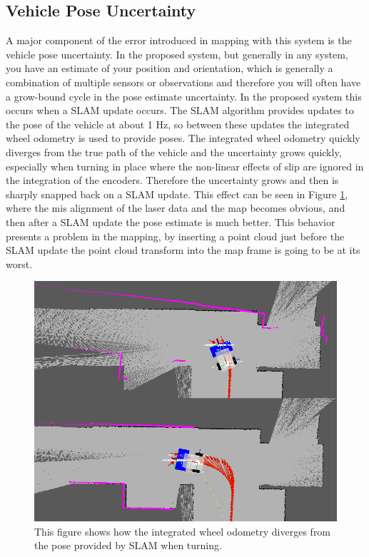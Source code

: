 \documentclass[12pt]{report}
\begin{document}
\subsection{Vehicle Pose Uncertainty}
A major component of the error introduced in mapping with this system is the vehicle pose uncertainty.  In the proposed system, but generally in any system, you have an estimate of your position and orientation, which is generally a combination of multiple sensors or observations and therefore you will often have a grow-bound cycle in the pose estimate uncertainty.  In the proposed system this occurs when a SLAM update occurs.  The SLAM algorithm provides updates to the pose of the vehicle at about 1 Hz, so between these updates the integrated wheel odometry is used to provide poses.  The integrated wheel odometry quickly diverges from the true path of the vehicle and the uncertainty grows quickly, especially when turning in place where the non-linear effects of slip are ignored in the integration of the encoders.  Therefore the uncertainty grows and then is sharply snapped back on a SLAM update.  This effect can be seen in Figure \ref{fig:uncertainty}, where the mis alignment of the laser data and the map becomes obvious, and then after a SLAM update the pose estimate is much better.  This behavior presents a problem in the mapping, by inserting a point cloud just before the SLAM update the point cloud transform into the map frame is going to be at its worst.

\begin{figure}[ht]
  \centering
  \includegraphics[width=6in,keepaspectratio]{uncertainty.png}
  \caption{This figure shows how the integrated wheel odometry diverges from the pose provided by SLAM when turning.}
  \label{fig:uncertainty}
\end{figure}
\end{document}
